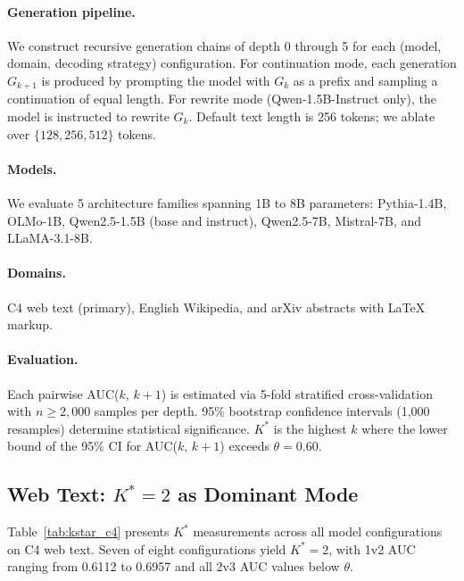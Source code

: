 \documentclass[11pt,a4paper]{article}
\begin{document}
\paragraph{Generation pipeline.}
We construct recursive generation chains of depth 0 through 5 for each (model, domain, decoding strategy) configuration. For continuation mode, each generation $G_{k+1}$ is produced by prompting the model with $G_k$ as a prefix and sampling a continuation of equal length. For rewrite mode (Qwen-1.5B-Instruct only), the model is instructed to rewrite $G_k$. Default text length is 256 tokens; we ablate over $\{128, 256, 512\}$ tokens.

\paragraph{Models.}
We evaluate 5 architecture families spanning 1B to 8B parameters: Pythia-1.4B, OLMo-1B, Qwen2.5-1.5B (base and instruct), Qwen2.5-7B, Mistral-7B, and LLaMA-3.1-8B.

\paragraph{Domains.}
C4 web text (primary), English Wikipedia, and arXiv abstracts with LaTeX markup.

\paragraph{Evaluation.}
Each pairwise AUC($k$, $k\!+\!1$) is estimated via 5-fold stratified cross-validation with $n \geq 2{,}000$ samples per depth. 95\% bootstrap confidence intervals (1{,}000 resamples) determine statistical significance. $K^*$ is the highest $k$ where the lower bound of the 95\% CI for AUC($k$, $k\!+\!1$) exceeds $\theta = 0.60$.

\subsection{Web Text: $K^*=2$ as Dominant Mode}
\label{sec:webtext}

Table~\ref{tab:kstar_c4} presents $K^*$ measurements across all model configurations on C4 web text. Seven of eight configurations yield $K^*=2$, with 1v2 AUC ranging from 0.6112 to 0.6957 and all 2v3 AUC values below $\theta$.
\end{document}
